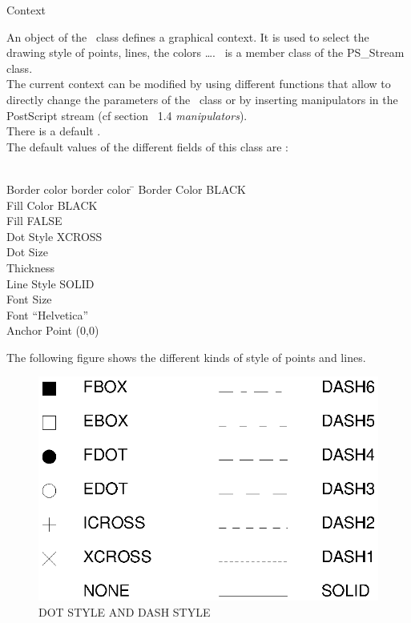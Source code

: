\begin{ccClass} {Context}

\ccDefinition

An object of the \ccClassName\ class defines a graphical context. It is used 
to select the drawing style of points, lines, the colors \ldots.
\ccClassName\ is a member class of the PS\_Stream class.\\

The current context can be modified by using
different functions that allow to directly change the parameters of the
\ccClassName\ class or by
inserting manipulators in the PostScript stream (cf section ~1.4 {\em manipulators}).\\ 

There is a default \ccClassName. \\
The default values of the different fields of this class are : \\
\\
\par
\begin{tabbing}
Border color border color \= \kill
Border Color     \>            BLACK\\
Fill Color       \>            BLACK\\
Fill             \>            FALSE\\
Dot Style        \>            XCROSS\\
Dot Size         \\
Thickness        \\
Line Style       \>            SOLID\\
Font Size        \\
Font             \>            ``Helvetica''\\
Anchor Point     \>            (0,0)\\
\end{tabbing}

The following figure shows the different kinds of style of points and lines.

\begin{figure}[h]
\includegraphics{PS_Stream/style.ps}
\caption{DOT STYLE AND DASH STYLE}
\end{figure}


\end{ccClass}
